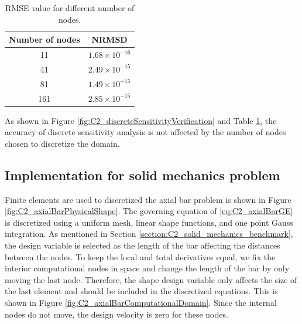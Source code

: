 \begin{table}[H]
\centering
\begin{tabular}{| c | c |}
    \hline
    Number of nodes & NRMSD \\ \hline \hline
    11 & $1.68 \times 10^{-16}$ \\ \hline
    41 & $2.49 \times 10^{-15}$ \\ \hline
    81 & $1.49 \times 10^{-15}$ \\ \hline
    161 & $2.85 \times 10^{-15}$ \\ \hline
\end{tabular}
\caption{RMSE value for different number of nodes.}
\label{table:C2_DSA_NRMSD}
\end{table}

As shown in Figure \ref{fig:C2_discreteSensitivityVerification} and Table \ref{table:C2_DSA_NRMSD}, the accuracy of discrete sensitivity analysis is not affected by the number of nodes chosen to discretize the domain.

\subsection{Implementation for solid mechanics problem}
Finite elements are used to discretized the axial bar problem is shown in Figure \ref{fig:C2_axialBarPhysicalShape}. The governing equation of \eqref{eq:C2_axialBarGE} is discretized using a uniform mesh, linear shape functions, and one point Gauss integration. As mentioned in Section \ref{section:C2_solid_mechanics_benchmark}, the design variable is selected as the length of the bar affecting the distances between the nodes. To keep the local and total derivatives equal, we fix the interior computational nodes in space and change the length of the bar by only moving the last node. Therefore, the shape design variable only affects the size of the last element and should be included in the discretized equations. This is shown in Figure \ref{fig:C2_axialBarComputationalDomain}. Since the internal nodes do not move, the design velocity is zero for these nodes.

